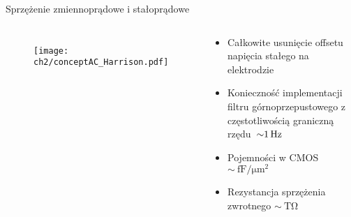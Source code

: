 


\begin{frame}{Sprzężenie zmiennoprądowe i stałoprądowe}
    

    \begin{columns}
        \vspace{-1em} %

        \begin{figure}[H]
            \centering
            \texttt{[image: ch2/conceptAC\_Harrison.pdf]} 
        \end{figure}
        \vspace{-2em} %

        {\renewcommand\normalsize{\small}%
        \normalsize
    
    
        \begin{exampleblock}{}

            \begin{itemize}
                \item Całkowite usunięcie offsetu napięcia stałego na elektrodzie 
                \item Konieczność implementacji filtru górnoprzepustowego z częstotliwością graniczną rzędu~$\SI{\sim 1}{\hertz}$ 
                \item Pojemności w CMOS $\sim\SI{}{\femto\farad\per\micro\metre\squared}$
                \item  Rezystancja sprzężenia zwrotnego  $\sim\SI{}{\tera\ohm}$
            \end{itemize}
        \end{exampleblock}
    
        }



\end{columns}
\end{frame}
